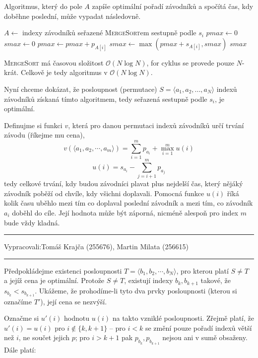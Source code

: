 \documentclass[12pt]{article}
\newcommand{\la}{\leftarrow}
\renewcommand{\O}{\mathcal{O}}
\newcommand{\zadani}[2]{
{\large
\noindent {\bf IB108 \hfill{} Sada #1, Příklad #2 \\[-4mm]}
\noindent\hrule
\vspace{2mm}
\noindent Vypracovali:\hfill{}Tomáš Krajča (255676), Martin Milata (256615)
\vspace{3mm}
\hrule
\bigskip\bigskip}
}
\begin{document}
Algoritmus, který do pole $A$ zapíše optimální pořadí závodníků a spočítá čas, kdy doběhne poslední,
může vypadat následovně.

\begin{algorithm}
\begin{algorithmic}
\STATE $A \la$ indexy závodníků seřazené \textsc{MergeSort}em sestupně podle $s_i$
\STATE $pmax \la 0$
\STATE $smax \la 0$
\FOR{$i \la 1 $ to $N$}
\STATE $pmax \la pmax + p_{A[i]}$
\STATE $smax \la \max(pmax+s_{A[i]},smax)$
\ENDFOR
\RETURN $smax$
\end{algorithmic}
\end{algorithm}

\noindent
\textsc{MergeSort} má časovou složitost $\O(N\log N)$, for cyklus se provede pouze $N$-krát.
Celkově je tedy algoritmus v $\O(N\log N)$.

\bigskip

\noindent
Nyní chceme dokázat, že posloupnost (permutace) $S = \langle a_1,a_2,...,a_N \rangle$ indexů
závodníků získaná tímto algoritmem, tedy seřazená sestupně podle $s_i$, je optimální.

Definujme si funkci $v$, která pro danou permutaci indexů závodníků určí trvání závodu (říkejme mu cena),
$$ v(\langle a_1,a_2,\cdots,a_m \rangle) = \sum_{i=1}^m p_{a_i} + \max_{i=1}^m u(i)$$
$$ u(i) = s_{a_i} - \sum_{j=i+1}^m p_{a_j}$$
tedy celkové trvání, kdy budou závodníci plavat plus nejdelší čas, který nějáký závodník poběží od
chvíle, kdy všichni doplavali. Pomocná funkce $u(i)$ říká kolik času uběhlo mezi tím co doplaval
poslední závodník a mezi tím, co závodník $a_i$ doběhl do cíle. Její hodnota může být záporná,
nicméně alespoň pro index $m$ bude vždy kladná.

\clearpage
\zadani{2}{2}

\noindent
Předpokládejme existenci posloupnosti $T = \langle b_1,b_2,\cdots,b_N \rangle$, pro kterou platí $S
\neq T$ a jejíž cena je optimální. Protože $S \neq T$, existují indexy $b_k, b_{k+1}$ takové, že
$s_{b_k} < s_{b_{k+1}}$. Ukážeme, že prohodíme-li tyto dva prvky posloupnosti (kterou si označíme
$T'$), její cena se nezvýší.

Označme si $u'(i)$ hodnotu $u(i)$ na takto vzniklé posloupnosti. Zřejmě platí, že $u'(i) = u(i)$ pro
$i \notin \{k, k+1\}$ -- pro $i < k$ se změní pouze pořadí indexů větší než $i$, ne součet jejich
$p$; pro $i > k+1$ pak $p_{b_k}, p_{b_{k+1}}$ nejsou ani v sumě obsaženy. Dále platí:
\end{document}
